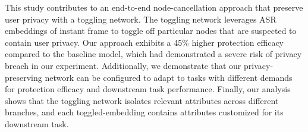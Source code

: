 \documentclass[lettersize,journal]{IEEEtran}
\begin{document}
This study contributes to an end-to-end node-cancellation approach that preserve user privacy with a toggling network. The toggling network leverages ASR embeddings of instant frame to toggle off particular nodes that are suspected to contain user privacy. Our approach exhibits a 45\% higher protection efficacy compared to the baseline model, which had demonstrated a severe risk of privacy breach in our experiment. Additionally, we demonstrate that our privacy-preserving network can be configured to adapt to tasks with different demands for protection efficacy and downstream task performance. Finally, our analysis shows that the toggling network isolates relevant attributes across different branches, and each toggled-embedding contains attributes customized for its downstream task.  
\end{document}
